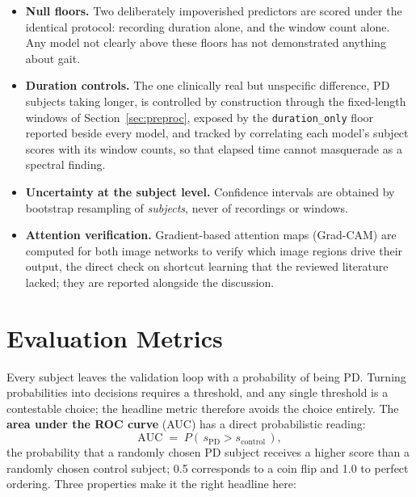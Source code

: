 \begin{itemize}
  \item \textbf{Null floors.} Two deliberately impoverished predictors are
        scored under the identical protocol: recording duration alone, and
        the window count alone. Any model not clearly above these floors has
        not demonstrated anything about gait.
  \item \textbf{Duration controls.} The one clinically real but unspecific
        difference, PD subjects taking longer, is controlled by construction
        through the fixed-length windows of Section~\ref{sec:preproc},
        exposed by the \texttt{duration\_only} floor reported beside every
        model, and tracked by correlating each model's subject scores with
        its window counts, so that elapsed time cannot masquerade as a
        spectral finding.
  \item \textbf{Uncertainty at the subject level.} Confidence intervals are
        obtained by bootstrap resampling of \emph{subjects}, never of
        recordings or windows.
  \item \textbf{Attention verification.} Gradient-based attention maps
        (Grad-CAM) are computed for both image networks to verify which
        image regions drive their output, the direct check on shortcut
        learning that the reviewed literature lacked; they are reported
        alongside the discussion.
\end{itemize}

\section{Evaluation Metrics}
\label{sec:metrics}

Every subject leaves the validation loop with a probability of being PD.
Turning probabilities into decisions requires a threshold, and any single
threshold is a contestable choice; the headline metric therefore avoids the
choice entirely. The \textbf{area under the ROC curve} (AUC) has a direct
probabilistic reading:
\begin{equation}
  \mathrm{AUC} \;=\; P\!\left(\, s_{\mathrm{PD}} > s_{\mathrm{control}} \,\right),
  \label{eq:auc}
\end{equation}
the probability that a randomly chosen PD subject receives a higher score
than a randomly chosen control subject; 0.5 corresponds to a coin flip and
1.0 to perfect ordering. Three properties make it the right headline here:

